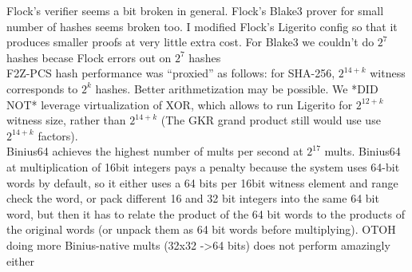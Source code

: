 \documentclass[11pt,letterpaper,usenames,dvipsnames]{article}
\begin{document}
\begin{table}[]
{\indent \hspace{1cm} Flock's verifier seems a bit broken in general. Flock's Blake3 prover for small number of hashes seems broken too. I modified Flock's Ligerito config so that it produces smaller proofs at very little extra cost.  For Blake3 we couldn't do $2^7$ hashes becase Flock errors out on $2^7$ hashes   \\ 
\indent \hspace{1cm} F2Z-PCS hash performance was ``proxied'' as follows: for SHA-256, $2^{14+k}$ witness corresponds to $2^k$ hashes. Better arithmetization may be possible. We *DID NOT* leverage virtualization of XOR, which allows to run Ligerito for $2^{12+k}$ witness size, rather than $2^{14+k}$ (The GKR grand product still would use use $2^{14+k}$ factors). \\
\indent \hspace{1cm} Binius64 achieves the highest number of mults per second at $2^{17}$ mults. Binius64 at multiplication of 16bit integers pays a  penalty because the system uses 64-bit words by default, so it either uses a  64 bits per 16bit witness element and range check the word, or pack different 16 and 32 bit integers into the same 64 bit word, but then it has to relate the product of the 64 bit words to the products of the original words (or unpack them as 64 bit words before multiplying). OTOH doing more Binius-native mults (32x32 ->64 bits) does not perform amazingly either  }
    \label{tab:placeholder}
\end{table}
\end{document}
